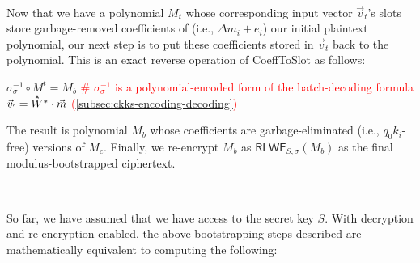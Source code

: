 



$ $

Now that we have a polynomial $M_t$ whose corresponding input vector $\vec{v}_t$'s slots store garbage-removed coefficients of (i.e., $\Delta m_i + e_i$) our initial plaintext polynomial, our next step is to put these coefficients stored in $\vec{v}_t$ back to the polynomial. This is an exact reverse operation of \textsf{CoeffToSlot} as follows:

$\sigma^{-1}_{\sigma} \circ M^t = M_b$ 
\textcolor{red}{ \# $\sigma^{-1}_{\sigma}$ is a polynomial-encoded form of the batch-decoding formula $\vec{v}_{'} = \hathat W^* \cdot \vec{m}$ (\autoref{subsec:ckks-encoding-decoding})}

The result is polynomial $M_b$ whose coefficients are garbage-eliminated (i.e., $q_0k_i$-free) versions of $M_c$. Finally, we re-encrypt $M_b$ as $\textsf{RLWE}_{S, \sigma}(M_b)$ as the final modulus-bootstrapped ciphertext. 


$ $

 So far, we have assumed that we have access to the secret key $S$. With decryption and re-encryption enabled, the above bootstrapping steps described are mathematically equivalent to computing the following:

